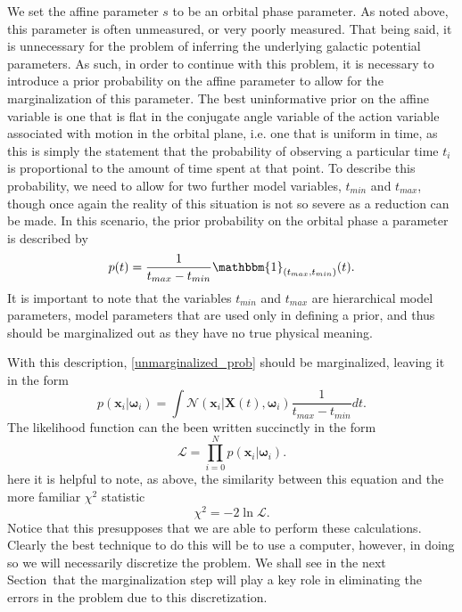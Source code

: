 \documentclass[12pt,preprint]{aastex}
\theoremstyle{plain}
\theoremstyle{definition}
\newcommand{\mtensor}[1]{\boldsymbol{#1}}
\newcommand{\mvector}[1]{\mtensor{#1}}
\newcommand{\vx}{\mvector{x}}
\newcommand{\vX}{\mvector{X}}
\newcommand{\vomega}{\mvector{\omega}}
\newcommand{\like}{\mathscr{L}}
\newcommand{\normal}{\mathscr{N}}
\newcommand{\sectionname}{Section}
\begin{document}
We set the affine parameter $s$ to be an orbital phase parameter. As noted above, this parameter is often unmeasured, or very poorly measured. That being said, it is unnecessary for the problem of inferring the underlying galactic potential parameters. As such, in order to continue with this problem, it is necessary to introduce a prior probability on the affine parameter to allow for the marginalization of this parameter. The best uninformative prior on the affine variable is one that is flat in the conjugate angle variable of the action variable associated with motion in the orbital plane, i.e. one that is uniform in time, as this is simply the statement that the probability of observing a particular time $t_i$ is proportional to the amount of time spent at that point. To describe this probability, we need to allow for two further model variables, $t_{min}$ and $t_{max}$, though once again the reality of this situation is not so severe as a reduction can be made. In this scenario, the prior probability on the orbital phase a parameter is described by
\begin{equation}
p(t) = \frac{1}{t_{max} - t_{min}}\mathbbm{1}_{(t_{max},t_{min})}(t).
\end{equation}
It is important to note that the variables $t_{min}$ and $t_{max}$ are hierarchical model parameters, model parameters that are used only in defining a prior, and thus should be marginalized out as they have no true physical meaning.

With this description, \eqref{unmarginalized_prob} should be marginalized, leaving it in the form
\begin{equation}\label{eq:marginalized_prob}
p(\vx_i | \vomega_i) = \int \normal(\vx_i|\vX(t), \vomega_i)\frac{1}{t_{max} - t_{min}}dt . 
\end{equation}
The likelihood function can the been written succinctly in the form 
\begin{equation}
\like = \prod_{i=0}^{N}p(\vx_i | \vomega_i).
\end{equation}
here it is helpful to note, as above, the similarity between this equation and the more familiar $\chi^2$ statistic
\[
\chi^2 = -2 \ln\like.
\]
Notice that this presupposes that we are able to perform these calculations. Clearly the best technique to do this will be to use a computer, however, in doing so we will necessarily discretize the problem. We shall see in the next \sectionname~that the marginalization step will play a key role in eliminating the errors in the problem due to this discretization.
\end{document}
